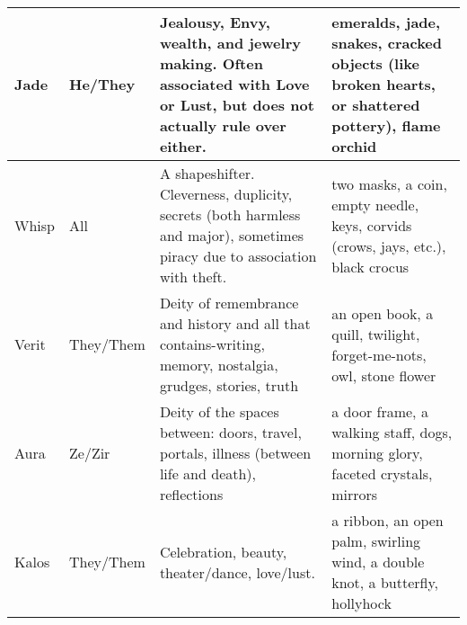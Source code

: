 \documentclass[blue]{GL2020}
\begin{document}
\begin{tabularx}{\textwidth}{|>{\centering\arraybackslash} m{1.8cm} |>{\centering\arraybackslash} m{1.5cm} | X |X |}
\hline	
	Jade & He/They & Jealousy, Envy, wealth, and jewelry making. Often associated with Love or Lust, but does not actually rule over either. & emeralds, jade, snakes, cracked objects (like broken hearts, or shattered pottery), flame orchid \\
\hline	
	Whisp & All & A shapeshifter. Cleverness, duplicity, secrets (both harmless and major), sometimes piracy due to association with theft. & two masks, a coin, empty needle, keys, corvids (crows, jays, etc.), black crocus \\
\hline	
	Verit & They/Them & Deity of remembrance and history and all that contains-writing, memory, nostalgia, grudges, stories, truth & an open book, a quill, twilight, forget-me-nots, owl, stone flower \\
\hline	
	Aura & Ze/Zir & Deity of the spaces between: doors, travel, portals, illness (between life and death), reflections & a door frame, a walking staff, dogs, morning glory, faceted crystals, mirrors \\
\hline	
	Kalos & They/Them & Celebration, beauty, theater/dance, love/lust. & a ribbon, an open palm, swirling wind, a double knot, a butterfly, hollyhock \\
\hline	
\end{tabularx}
\end{document}
